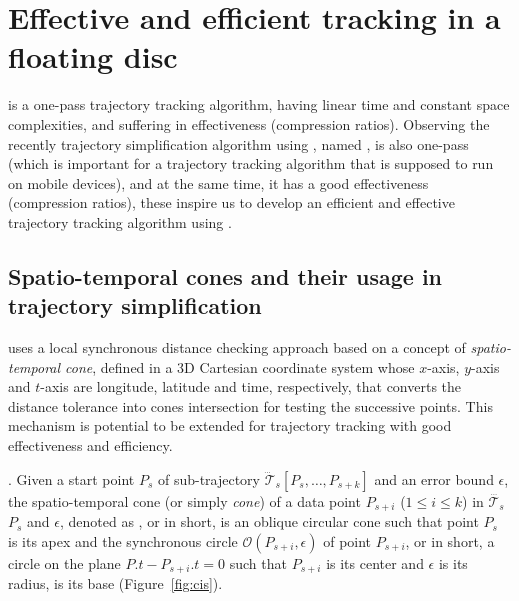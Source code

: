 \section{Effective and efficient tracking in a floating disc}
\label{sec:circle}

{\ldrh is a one-pass trajectory tracking algorithm, having linear time and constant space complexities, and suffering in effectiveness (compression ratios).
Observing the recently trajectory simplification algorithm using \sed, named  \cised, is also one-pass (which is important for a trajectory tracking algorithm that is supposed to run on mobile devices), and at the same time, it has a good effectiveness (compression ratios), these inspire us to develop an efficient and effective trajectory tracking algorithm using \sed.}


\subsection{Spatio-temporal cones and their usage in trajectory simplification}

\cised uses a local synchronous distance checking approach based on a concept of \textit{spatio-temporal cone}, defined in a 3D Cartesian coordinate system whose $x$-axis, $y$-axis and $t$-axis are longitude, latitude and time, respectively, that converts the \sed distance tolerance into cones intersection for testing the successive points. This mechanism is potential to be extended for trajectory tracking with good effectiveness and efficiency.

. 
Given a start point $P_s$ of sub-trajectory $\dddot{\mathcal{T}}_s[P_s, \ldots, P_{s+k}]$ and an error bound $\epsilon$, the spatio-temporal cone (or simply \textit{cone}) of a data point $P_{s+i}$ ($1\le i\le k$) in $\dddot{\mathcal{T}_s}$ \wrt $P_s$ and $\epsilon$, denoted as , or  in short, is an oblique circular cone such that point $P_s$ is its apex and the synchronous circle $\mathcal{O}(P_{s+i}, \epsilon)$ of point $P_{s+i}$, or  in short, a circle on the plane $P.t-P_{s+i}.t = 0$ such that $P_{s+i}$ is its center and $\epsilon$ is its radius, is its base (Figure~\ref{fig:cis}).



